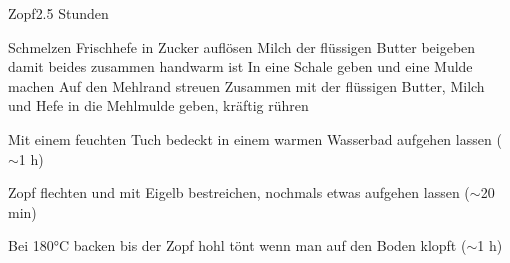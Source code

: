\begin{recipe}{Zopf}{}{2.5 Stunden}

Schmelzen
Frischhefe in Zucker auflösen
Milch der flüssigen Butter beigeben damit beides zusammen handwarm ist
In eine Schale geben und eine Mulde machen
Auf den Mehlrand streuen
Zusammen mit der flüssigen Butter, Milch und Hefe in die Mehlmulde geben, kräftig rühren

\ingredient[]{}{}
Mit einem feuchten Tuch bedeckt in einem warmen Wasserbad aufgehen lassen ($\sim$1 h)

Zopf flechten und mit Eigelb bestreichen, nochmals etwas aufgehen lassen ($\sim$20 min)

\ingredient[]{}{}
Bei 180°C backen bis der Zopf hohl tönt wenn man auf den Boden klopft ($\sim$1 h)

\end{recipe}
